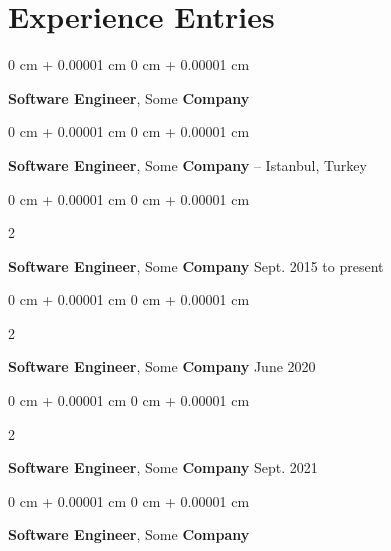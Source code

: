 \documentclass[10pt, letterpaper]{article}
\newenvironment{onecolentry}{
    \begin{adjustwidth}{
        0 cm + 0.00001 cm
    }{
        0 cm + 0.00001 cm
    }
}{
    \end{adjustwidth}
} %
\newenvironment{twocolentry}[2][]{
    \onecolentry
    \def\secondColumn{#2}
    \setcolumnwidth{\fill, 4.5 cm}
    \begin{paracol}{2}
}{
    \switchcolumn \raggedleft \secondColumn
    \end{paracol}
    \endonecolentry
} %
\begin{document}
    
    \section{Experience Entries}

        
        \begin{onecolentry}
            \textbf{Software Engineer}, Some \textbf{Company}\end{onecolentry}



        \vspace{0.2 cm}

        \begin{onecolentry}
            \textbf{Software Engineer}, Some \textbf{Company} -- Istanbul, Turkey\end{onecolentry}



        \vspace{0.2 cm}

        \begin{twocolentry}{
            Sept. 2015 to present
        }
            \textbf{Software Engineer}, Some \textbf{Company}\end{twocolentry}



        \vspace{0.2 cm}

        \begin{twocolentry}{
            June 2020
        }
            \textbf{Software Engineer}, Some \textbf{Company}\end{twocolentry}



        \vspace{0.2 cm}

        \begin{twocolentry}{
            Sept. 2021
        }
            \textbf{Software Engineer}, Some \textbf{Company}\end{twocolentry}



        \vspace{0.2 cm}

        \begin{onecolentry}
            \textbf{Software Engineer}, Some \textbf{Company}\end{onecolentry}
\end{document}
